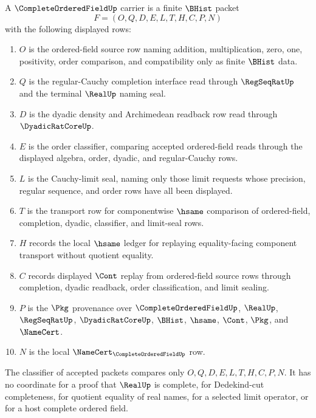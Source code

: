 \begin{definition}
\label{def:complete-ordered-field-carrier}
A $\CompleteOrderedFieldUp$ carrier is a finite $\BHist$ packet
$$
F=(O,Q,D,E,L,T,H,C,P,N)
$$
with the following displayed rows:
\begin{enumerate}
\item $O$ is the ordered-field source row naming addition, multiplication, zero, one, positivity, order comparison, and compatibility only as finite $\BHist$ data.
\item $Q$ is the regular-Cauchy completion interface read through $\RegSeqRatUp$ and the terminal $\RealUp$ naming seal.
\item $D$ is the dyadic density and Archimedean readback row read through $\DyadicRatCoreUp$.
\item $E$ is the order classifier, comparing accepted ordered-field reads through the displayed algebra, order, dyadic, and regular-Cauchy rows.
\item $L$ is the Cauchy-limit seal, naming only those limit requests whose precision, regular sequence, and order rows have all been displayed.
\item $T$ is the transport row for componentwise $\hsame$ comparison of ordered-field, completion, dyadic, classifier, and limit-seal rows.
\item $H$ records the local $\hsame$ ledger for replaying equality-facing component transport without quotient equality.
\item $C$ records displayed $\Cont$ replay from ordered-field source rows through completion, dyadic readback, order classification, and limit sealing.
\item $P$ is the $\Pkg$ provenance over $\CompleteOrderedFieldUp$, $\RealUp$, $\RegSeqRatUp$, $\DyadicRatCoreUp$, $\BHist$, $\hsame$, $\Cont$, $\Pkg$, and $\NameCert$.
\item $N$ is the local $\NameCert_{\CompleteOrderedFieldUp}$ row.
\end{enumerate}
The classifier of accepted packets compares only $O,Q,D,E,L,T,H,C,P,N$. It has no coordinate for a proof that $\RealUp$ is complete, for Dedekind-cut completeness, for quotient equality of real names, for a selected limit operator, or for a host complete ordered field.
\end{definition}

